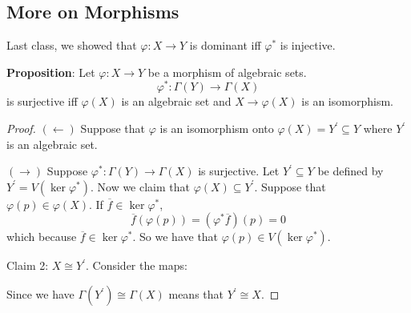\documentclass{report}
\begin{document}
\begin{topic}
    \section{More on Morphisms}
\end{topic}

Last class, we showed that $\varphi : X \rightarrow Y$ is dominant iff $\varphi^{*}$ is injective.

\textbf{Proposition}: Let $\varphi : X \rightarrow Y$ be a morphism of algebraic sets.
    \begin{equation*}
        \varphi^{*}: \Gamma(Y) \rightarrow \Gamma(X)
    \end{equation*}
is surjective iff $\varphi(X)$ is an algebraic set and $X  \rightarrow \varphi(X)$ is an isomorphism.
    \begin{proof}
        $(\leftarrow )$ Suppose that $\varphi$ is an isomorphism onto $\varphi(X) = Y^{\prime} \subseteq Y$ where $Y^{\prime}$ is an algebraic set.
            \begin{center}
            \end{center}
        $(\rightarrow )$ Suppose $\varphi^{*} : \Gamma(Y) \rightarrow \Gamma(X)$ is surjective. Let $Y^{\prime} \subseteq Y$ be defined by $Y^{\prime} = V(\ker{\varphi^{*}})$. Now we claim that $\varphi(X) \subseteq Y^{\prime}$. Suppose that $\varphi(p) \in \varphi(X)$. If $\overline{f} \in \ker{\varphi^{*}}$,
            \begin{equation*}
                \overline{f}(\varphi(p)) = (\varphi^{*}\overline{f})(p) = 0
            \end{equation*}
        which because $\overline{f} \in \ker{\varphi^{*}}$. So we have that $\varphi(p) \in V(\ker{\varphi^{*}})$.

        Claim 2: $X \cong Y^{\prime}$. Consider the maps:
            \begin{center}
            \end{center}
        Since we have $\Gamma(Y^{\prime}) \cong \Gamma(X)$ means that $Y^{\prime} \cong X$.
    \end{proof}
\end{document}
